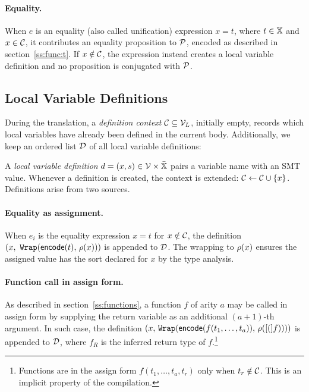 \paragraph{Equality.}
When $e$ is an equality (also called unification) expression $x = t$, where $t \in \mathbb{X}$ and $x \in \mathcal{C}$, it contributes an equality proposition to $\mathcal{P}$, encoded as described in section~\ref{ss:func:t}.
If $x \notin \mathcal{C}$, the expression instead creates a local variable definition and no proposition is conjugated with $\mathcal{P}$.

\subsection{Local Variable Definitions}
\label{ss:expr:let}

During the translation, a \emph{definition context} $\mathcal{C} \subseteq \mathcal{V}_L$, initially empty, records which local variables have already been defined in the current body.
Additionally, we keep an ordered list $\mathcal{D}$ of all local variable definitions:

A \emph{local variable definition} $d = (x, s) \in \mathcal{V} \times \bar{\mathbb{X}}$ pairs a variable name with an SMT value.
Whenever a definition is created, the context is extended: $\mathcal{C} \leftarrow \mathcal{C} \cup \{x\}$.
Definitions arise from two sources.

\paragraph{Equality as assignment.}
When $e_i$ is the equality expression $x = t$ for $x \notin \mathcal{C}$, the definition $(x,\ \texttt{Wrap}(\mathsf{encode}(t),\, \rho(x)))$ is appended to $\mathcal{D}$.
The wrapping to $\rho(x)$ ensures the assigned value has the sort declared for $x$ by the type analysis.

\paragraph{Function call in assign form.}
As described in section~\ref{ss:functions}, a function $f$ of arity $a$ may be called in assign form by supplying the return variable as an additional $(a+1)$-th argument.
In such case, the definition $(x,\, \texttt{Wrap}(\encode(f(t_1, \dots, t_a)),\, \depth(\ref(f))))$ is appended to $\mathcal{D}$, where $f_R$ is the inferred return type of $f$.\footnote{
  Functions are in the assign form $f(t_1, \dots, t_a, t_r)$ only when $t_r \notin \mathcal{C}$.
  This is an implicit property of the \rego compilation.
}

